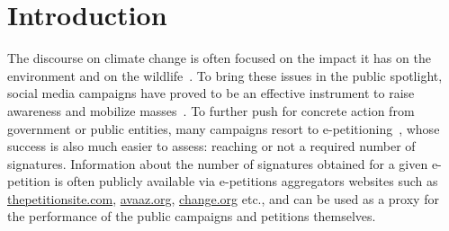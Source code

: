 \section{Introduction}
\label{sec:intro}

%
%

The discourse on climate change is often focused on the impact it has on the environment and on the wildlife~\cite{solomon2009irreversible}.
To bring these issues in the public spotlight, social media campaigns have proved to be an effective instrument to raise awareness and mobilize masses~\cite{Pearce2014}.
To further push for concrete action from government or public entities, many campaigns resort to e-petitioning~\cite{mosca2009petitioning}, whose success is also much easier to assess: reaching or not a required number of signatures.
Information about the number of signatures obtained for a given e-petition is often publicly available via e-petitions aggregators websites such as \url{thepetitionsite.com}, \url{avaaz.org}, \url{change.org} etc., and can be used as a proxy for the performance of the public campaigns and petitions themselves.

%

